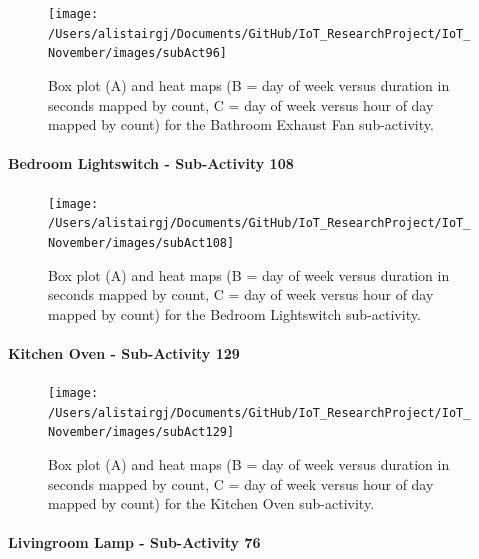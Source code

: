 \documentclass[11pt,]{article}
\let\oldparagraph\paragraph
\renewcommand{\paragraph}[1]{\oldparagraph{#1}\mbox{}}
\begin{document}
\begin{figure}[H]

{\centering \texttt{[image: /Users/alistairgj/Documents/GitHub/IoT\_ResearchProject/IoT\_November/images/subAct96]} 

}

\caption{Box plot (A) and heat maps (B = day of week versus duration in seconds mapped by count, C = day of week versus hour of day mapped by count) for the Bathroom Exhaust Fan sub-activity.}\label{fig:subAct96}
\end{figure}

\hypertarget{bedroom-lightswitch---sub-activity-108}{%
\paragraph{Bedroom Lightswitch - Sub-Activity
108}\label{bedroom-lightswitch---sub-activity-108}}

\begin{figure}[H]

{\centering \texttt{[image: /Users/alistairgj/Documents/GitHub/IoT\_ResearchProject/IoT\_November/images/subAct108]} 

}

\caption{Box plot (A) and heat maps (B = day of week versus duration in seconds mapped by count, C = day of week versus hour of day mapped by count) for the Bedroom Lightswitch sub-activity.}\label{fig:subAct108}
\end{figure}

\hypertarget{kitchen-oven---sub-activity-129}{%
\paragraph{Kitchen Oven - Sub-Activity
129}\label{kitchen-oven---sub-activity-129}}

\begin{figure}[H]

{\centering \texttt{[image: /Users/alistairgj/Documents/GitHub/IoT\_ResearchProject/IoT\_November/images/subAct129]} 

}

\caption{Box plot (A) and heat maps (B = day of week versus duration in seconds mapped by count, C = day of week versus hour of day mapped by count) for the Kitchen Oven sub-activity.}\label{fig:subAct129}
\end{figure}

\hypertarget{livingroom-lamp---sub-activity-76}{%
\paragraph{Livingroom Lamp - Sub-Activity
76}\label{livingroom-lamp---sub-activity-76}}
\end{document}
